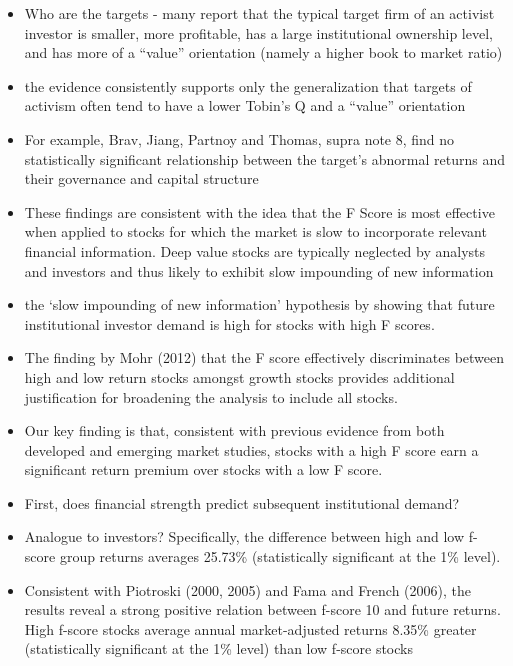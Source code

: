 \documentclass[12pt]{article}
\begin{document}
    \begin{itemize}

        \item Who are the targets - many report that the typical target firm of an activist investor is smaller, more profitable, has a large institutional ownership level, and has more of a “value” orientation (namely a higher book to market ratio) \citep{CoffeeJr.2014}

        \item the evidence consistently supports only the generalization that targets of activism often tend to have a lower Tobin’s Q and a “value” orientation \citep{CoffeeJr.2014}

        \item For example, Brav, Jiang, Partnoy and Thomas, supra note 8, find no statistically significant relationship between the target’s abnormal returns and their governance and capital structure \citep{CoffeeJr.2014}

        \item These findings are consistent with the idea that the F Score is most effective when applied to stocks for which the market is slow to incorporate relevant financial information. Deep value stocks are typically neglected by analysts and investors and thus likely to exhibit slow impounding of new information \citep{Hyde2014}

        \item the ‘slow impounding of new information’ hypothesis by showing that future institutional investor demand is high for stocks with high F scores. \citep{Hyde2014}

        \item The finding by Mohr (2012) that the F score effectively discriminates between high and low return stocks amongst growth stocks provides additional justification for broadening the analysis to include all stocks. \citep{Hyde2014}

        \item Our key finding is that, consistent with previous evidence from both developed and emerging market studies, stocks with a high F score earn a significant return premium over stocks with a low F score.\citep{Hyde2014}

        \item First, does financial strength predict subsequent institutional demand? \citep{Choi2012}

        \item Analogue to investors? Specifically, the difference between high and low f-score group returns averages 25.73\% (statistically significant at the 1\% level). \citep{Choi2012}

        \item Consistent with Piotroski (2000, 2005) and Fama and French (2006), the results reveal a strong positive relation between f-score 10 and future returns. High f-score stocks average annual market-adjusted returns 8.35\% greater (statistically significant at the 1\% level) than low f-score stocks \citep{Choi2012} 

    \end{itemize}
\end{document}
